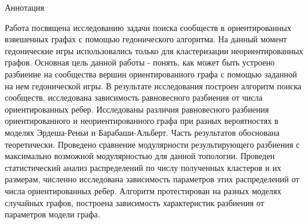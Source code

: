 \begin{center}
	\large 	Аннотация
\end{center}

Работа посвящена исследованию задачи поиска сообществ в ориентированных взвешенных графах с помощью гедонического алгоритма. На данный момент гедонические игры использовались только для кластеризации неориентированных графов. Основная цель данной работы - понять, как может быть устроено разбиение на сообщества вершин ориентированного графа с помощью заданной на нем гедонической игры. В результате исследования построен алгоритм поиска сообществ, исследована зависимость равновесного разбиения от числа ориентированных ребер. Исследованы различия равновесного разбиения ориентированного и неориентированного графа при разных вероятностях в моделях Эрдеша-Реньи и Барабаши-Альберт. Часть результатов обоснована теоретически. Проведено сравнение модулярности результирующего разбиения с максимально возможной модулярностью для данной топологии. Проведен статистический анализ распределений по числу полученных кластеров и их размерам, численно исследована зависимость параметров этих распределений от числа ориентированных ребер. Алгоритм протестирован на разных моделях случайных графов, построена зависимость характеристик разбиения от параметров модели графа.